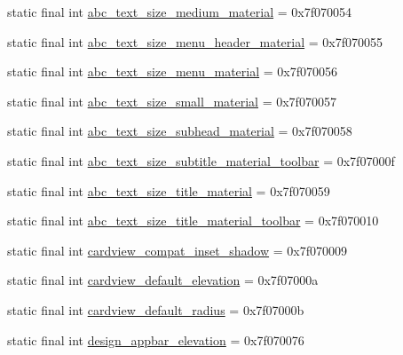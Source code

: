 \begin{CompactItemize}
\item 
static final int \hyperlink{classandroid_1_1support_1_1graphics_1_1drawable_1_1_r_1_1dimen_1142052f8f29591bc93cbab591f7b962}{abc\_\-text\_\-size\_\-medium\_\-material} = 0x7f070054
\item 
static final int \hyperlink{classandroid_1_1support_1_1graphics_1_1drawable_1_1_r_1_1dimen_dd307eeff37dd5858861f8e60f662aa2}{abc\_\-text\_\-size\_\-menu\_\-header\_\-material} = 0x7f070055
\item 
static final int \hyperlink{classandroid_1_1support_1_1graphics_1_1drawable_1_1_r_1_1dimen_a1a03f508f49128343e0c22a48647343}{abc\_\-text\_\-size\_\-menu\_\-material} = 0x7f070056
\item 
static final int \hyperlink{classandroid_1_1support_1_1graphics_1_1drawable_1_1_r_1_1dimen_8939448a3cd2f98ee60ec4ffd6327e36}{abc\_\-text\_\-size\_\-small\_\-material} = 0x7f070057
\item 
static final int \hyperlink{classandroid_1_1support_1_1graphics_1_1drawable_1_1_r_1_1dimen_ff43a798e54ec95e1f3a7ef0f537b4ce}{abc\_\-text\_\-size\_\-subhead\_\-material} = 0x7f070058
\item 
static final int \hyperlink{classandroid_1_1support_1_1graphics_1_1drawable_1_1_r_1_1dimen_a2cffdb34d9bd74aab6a2a34ab0d5bbe}{abc\_\-text\_\-size\_\-subtitle\_\-material\_\-toolbar} = 0x7f07000f
\item 
static final int \hyperlink{classandroid_1_1support_1_1graphics_1_1drawable_1_1_r_1_1dimen_661b3723c0ed3500495ac5fd986538dc}{abc\_\-text\_\-size\_\-title\_\-material} = 0x7f070059
\item 
static final int \hyperlink{classandroid_1_1support_1_1graphics_1_1drawable_1_1_r_1_1dimen_0da8cca42442bb7f7479f54285f30ef1}{abc\_\-text\_\-size\_\-title\_\-material\_\-toolbar} = 0x7f070010
\item 
static final int \hyperlink{classandroid_1_1support_1_1graphics_1_1drawable_1_1_r_1_1dimen_35220a85119263d15deb946c6d648c84}{cardview\_\-compat\_\-inset\_\-shadow} = 0x7f070009
\item 
static final int \hyperlink{classandroid_1_1support_1_1graphics_1_1drawable_1_1_r_1_1dimen_0945b41fe89b966f2263da0b792bfb12}{cardview\_\-default\_\-elevation} = 0x7f07000a
\item 
static final int \hyperlink{classandroid_1_1support_1_1graphics_1_1drawable_1_1_r_1_1dimen_10e5a44fc3e8cb3fdf22b161c13116e3}{cardview\_\-default\_\-radius} = 0x7f07000b
\item 
static final int \hyperlink{classandroid_1_1support_1_1graphics_1_1drawable_1_1_r_1_1dimen_4b9ffec2f4ea42adbf491eb48862bbee}{design\_\-appbar\_\-elevation} = 0x7f070076

\end{CompactItemize}
